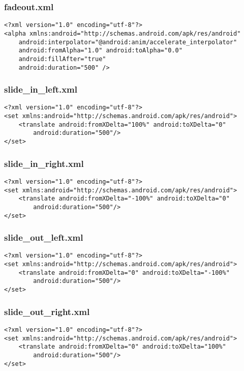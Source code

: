 \subsubsection{fadeout.xml}
\begin{lstlisting}
<?xml version="1.0" encoding="utf-8"?>
<alpha xmlns:android="http://schemas.android.com/apk/res/android"
    android:interpolator="@android:anim/accelerate_interpolator"
    android:fromAlpha="1.0" android:toAlpha="0.0"
    android:fillAfter="true"
    android:duration="500" />
\end{lstlisting}

\subsubsection{slide\_in\_left.xml}
\begin{lstlisting}
<?xml version="1.0" encoding="utf-8"?>
<set xmlns:android="http://schemas.android.com/apk/res/android">
    <translate android:fromXDelta="100%" android:toXDelta="0"
        android:duration="500"/>
</set>
\end{lstlisting}

\subsubsection{slide\_in\_right.xml}
\begin{lstlisting}
<?xml version="1.0" encoding="utf-8"?>
<set xmlns:android="http://schemas.android.com/apk/res/android">
    <translate android:fromXDelta="-100%" android:toXDelta="0"
        android:duration="500"/>
</set>
\end{lstlisting}

\subsubsection{slide\_out\_left.xml}
\begin{lstlisting}
<?xml version="1.0" encoding="utf-8"?>
<set xmlns:android="http://schemas.android.com/apk/res/android">
    <translate android:fromXDelta="0" android:toXDelta="-100%"
        android:duration="500"/>
</set>
\end{lstlisting}

\subsubsection{slide\_out\_right.xml}
\begin{lstlisting}
<?xml version="1.0" encoding="utf-8"?>
<set xmlns:android="http://schemas.android.com/apk/res/android">
    <translate android:fromXDelta="0" android:toXDelta="100%"
        android:duration="500"/>
</set>
\end{lstlisting}

